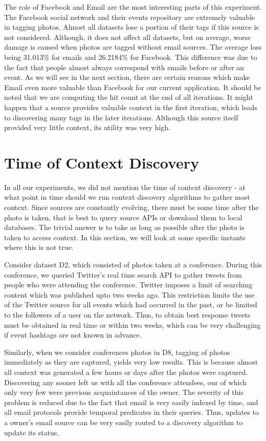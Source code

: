 The role of Facebook and Email are the most interesting parts of this experiment. The Facebook social network and their events repository are extremely valuable in tagging photos. Almost all datasets lose a portion of their tags if this source is not considered. Although, it does not affect all datasets, but on average, worse damage is caused when photos are tagged without email sources. The average loss being 31.013\% for emails and 26.2184\% for Facebook. This difference was due to the fact that people almost always correspond with emails before or after an event. As we will see in the next section, there are certain reasons which make Email even more valuable than Facebook for our current application. It should be noted that we are computing the hit count at the end of all iterations. It might happen that a source provides valuable context in the first iteration, which leads to discovering many tags in the later iterations. Although this source itself provided very little context, its utility was very high.

\section{Time of Context Discovery}

In all our experiments, we did not mention the time of context discovery - at what point in time should we run context discovery algorithms to gather most context. Since sources are constantly evolving, there must be some time after the photo is taken, that is best to query source APIs or download them to local databases. The trivial answer is to take as long as possible after the photo is taken to access context. In this section, we will look at some specific instants where this is not true.

Consider dataset D2, which consisted of photos taken at a conference. During this conference, we queried Twitter's real time search API to gather tweets from people who were attending the conference. Twitter imposes a limit of searching content which was published upto two weeks ago. This restriction limits the use of the Twitter source for all events which had occurred in the past, or be limited to the followers of a user on the network. Thus, to obtain best response tweets must be obtained in real time or within two weeks, which can be very challenging if event hashtags are not known in advance.

Similarly, when we consider conferences photos in D8, tagging of photos immediately as they are captured, yields very low results. This is because almost all context was generated a few hours or days after the photos were captured. Discovering any sooner left us with all the conference attendees, our of which only very few were previous acquaintances of the owner. The severity of this problem is reduced due to the fact that email is very easily indexed by time, and all email protocols provide temporal predicates in their queries. Thus, updates to a owner's email source can be very easily routed to a discovery algorithm to update its status.

